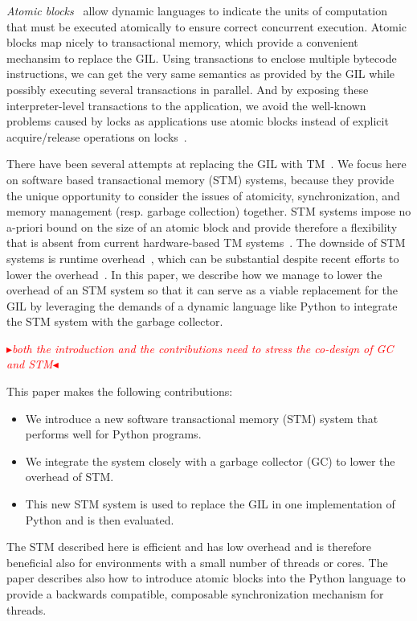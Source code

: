\documentclass{sigplanconf}
\newcommand{\mynote}[2]{%
  \textcolor{red}{%
    \fbox{\bfseries\sffamily\scriptsize#1}%
    {\small$\blacktriangleright$\textsf{\emph{#2}}$\blacktriangleleft$}%
  }%
}
\newcommand\cfbolz[1]{\mynote{cfbolz}{#1}}
\begin{document}
\emph{Atomic blocks}~\cite{tim03,tim05} allow dynamic languages to
indicate the units of computation that must be executed atomically to
ensure correct concurrent execution.  Atomic blocks map nicely to
transactional memory, which provide a convenient mechansim to replace
the GIL.  Using transactions to enclose multiple bytecode
instructions, we can get the very same semantics as provided by the
GIL while possibly executing several transactions in parallel. And by
exposing these interpreter-level transactions to the application, we
avoid the well-known problems caused by locks as applications use
atomic blocks instead of explicit acquire/release operations on
locks~\cite{christopher10,victor11,shan08}.

There have been several attempts at replacing the GIL with
TM~\cite{nicholas06,odaira14,fuad10}.  We focus here on software based
transactional memory (STM) systems, because they provide the unique
opportunity to consider the issues of atomicity, synchronization, and
memory management (resp. garbage collection) together.  STM systems
impose no a-priori bound on the size of an atomic block and provide
therefore a flexibility that is absent from current hardware-based TM
systems~\cite{wayforward14}.  The downside of STM systems is runtime
overhead~\cite{cascaval08,drago11}, which can be substantial despite
recent efforts to lower the overhead~\cite{warmhoff13,spear09}.  In
this paper, we describe how we manage to lower the overhead of an STM
system so that it can serve as a viable replacement for the GIL by
leveraging the demands of a dynamic language like Python to integrate
the STM system with the garbage collector.



\cfbolz{both the introduction and the contributions need to stress the co-design of GC and STM}

This paper makes the following contributions:
\begin{itemize}[noitemsep]
\item We introduce a new software transactional memory (STM) system
  that performs well for Python programs.
\item We integrate the  system closely with a garbage collector
  (GC) to lower the overhead of STM.
\item This new STM system is used to replace the GIL in one
  implementation of Python and is then evaluated.
\end{itemize}
The STM described here is efficient and has low overhead and is therefore beneficial also
for environments with a small number of threads or cores. The paper describes also
how to introduce atomic blocks into the Python language to provide a
  backwards compatible, composable synchronization mechanism for
  threads.
\end{document}
